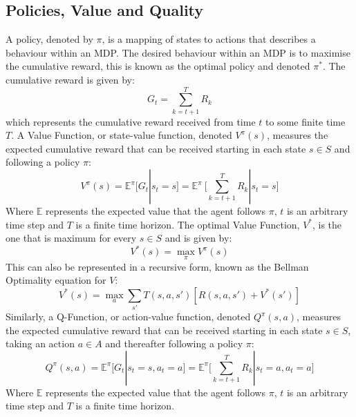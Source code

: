 \subsection{Policies, Value and Quality}
A policy, denoted by $\pi$, is a mapping of states to actions that describes a behaviour within an MDP. The desired behaviour within an MDP is to maximise the cumulative reward, this is known as the optimal policy and denoted $\pi^*$. The cumulative reward is given by:
\begin{equation}
\label{eqn:return}
G_t = \sum_{k=t+1}^TR_{k}
\end{equation}
which represents the cumulative reward received from time $t$ to some finite time $T$.
A Value Function, or state-value function, denoted $V^\pi(s)$, measures the expected cumulative reward that can be received starting in each state $s \in S$ and following a policy $\pi$:
\begin{equation}
\label{eqn:vs}
    V^\pi(s) = \mathbb{E}^\pi\Bigg[G_t | s_t = s\Bigg] = \mathbb{E}^\pi\ \Bigg[\sum_{k=t+1}^TR_{k} | s_t = s \Bigg]
\end{equation}
Where $\mathbb{E}$ represents the expected value that the agent follows $\pi$, $t$ is an arbitrary time step and $T$ is a finite time horizon.
The optimal Value Function, $V^*$, is the one that is maximum for every $s \in S$ and is given by:
\begin{equation}
\label{eqn:vsm}
     V^*(s) = \max_\pi V^\pi(s) 
\end{equation}
This can also be represented in a recursive form, known as the Bellman Optimality equation for $V$:
\begin{equation}
\label{eqn:vsB}
V^*(s) = \max_a\sum_{s'}T(s,a,s')[R(s,a,s')+V^*(s')]
\end{equation}
Similarly, a Q-Function, or action-value function, denoted $Q^\pi(s,a)$, measures the expected cumulative reward that can be received starting in each state $s \in S$, taking an action $a \in A$ and thereafter following a policy $\pi$:
\begin{equation}
\label{eqn:qsa}
Q^\pi(s,a) = \mathbb{E}^\pi\Bigg[G_t | s_t = s,a_t = a\Bigg] = \mathbb{E}^\pi\Bigg[\sum_{k=t+1}^TR_{k}|s_t=a, a_t = a\Bigg]
\end{equation}
Where $\mathbb{E}$ represents the expected value that the agent follows $\pi$, $t$ is an arbitrary time step and $T$ is a finite time horizon.
